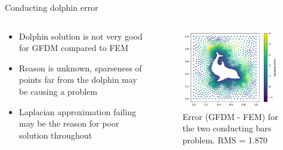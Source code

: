 \documentclass{beamer}
\begin{document}
\begin{frame}{Conducting dolphin error}
\begin{columns}
    \begin{column}{0.5\linewidth}
    \begin{itemize}
        \item Dolphin solution is not very good for GFDM compared to FEM
        \item Reason is unknown, sparseness of points far from the dolphin may be causing a problem
        \item Laplacian approximation failing may be the reason for poor solution throughout
    \end{itemize}
    \end{column}
    \begin{column}{0.5\linewidth}
        \begin{figure}[h]
        \includegraphics[width=0.95\textwidth]{Figures/Dolfin_Error.png}
        \caption{Error (GFDM - FEM) for the two conducting bars problem. RMS = 1.870}
        \label{fig:dolfin_error}
        \end{figure}
    \end{column}
\end{columns}
\end{frame}
\end{document}
